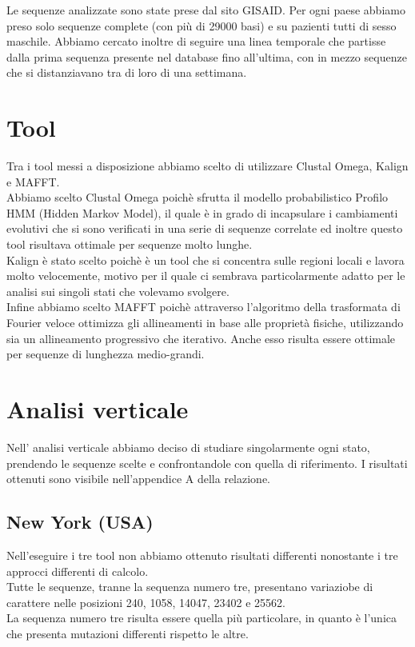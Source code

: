 \documentclass[a4paper,10pt]{article}
\begin{document}
Le sequenze analizzate sono state prese dal sito GISAID. Per ogni paese abbiamo preso solo sequenze complete (con più di 29000 basi) e su pazienti tutti di sesso maschile. Abbiamo cercato inoltre di seguire una linea temporale che partisse dalla prima sequenza presente nel database fino all'ultima, con in mezzo sequenze che si distanziavano tra di loro di una settimana.

\section{Tool}
Tra i tool messi a disposizione abbiamo scelto di utilizzare Clustal Omega, Kalign e MAFFT.\\
Abbiamo scelto Clustal Omega poichè sfrutta il modello probabilistico Profilo HMM (Hidden Markov Model), il quale è in grado di incapsulare i cambiamenti evolutivi che si sono verificati in una serie di sequenze correlate ed inoltre questo tool risultava ottimale per sequenze molto lunghe.\\
Kalign è stato scelto poichè è un tool che si concentra sulle regioni locali e lavora molto velocemente, motivo per il quale ci sembrava particolarmente adatto per le analisi sui singoli stati che volevamo svolgere.\\
Infine abbiamo scelto MAFFT poichè attraverso l'algoritmo della trasformata di Fourier veloce ottimizza gli allineamenti in base alle proprietà fisiche, utilizzando sia un allineamento progressivo che iterativo. Anche esso risulta essere ottimale per sequenze di lunghezza medio-grandi.\\

\section{Analisi verticale}
Nell' analisi verticale abbiamo deciso di studiare singolarmente ogni stato, prendendo le sequenze scelte e confrontandole con quella di riferimento. I risultati ottenuti sono visibile nell'appendice A della relazione.
\subsection{New York (USA)}
Nell'eseguire i tre tool non abbiamo ottenuto risultati differenti nonostante i tre approcci differenti di calcolo.\\ %
Tutte le sequenze, tranne la sequenza numero tre, presentano variaziobe di carattere nelle posizioni 240, 1058, 14047, 23402 e 25562.\\
La sequenza numero tre risulta essere quella più particolare, in quanto è l'unica che presenta mutazioni differenti rispetto le altre.\\
\end{document}
